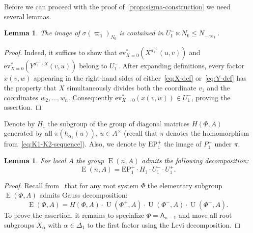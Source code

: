 \documentclass[oneside, 10pt]{amsart}
\DeclareMathOperator{\E}{E}
\DeclareMathOperator{\UU}{U}
\newcommand{\rA}{\mathsf{A}}
\numberwithin{equation}{section}
\numberwithin{thm}{section}
\newtheorem{lemma}[thm]{Lemma}
\numberwithin{lemma}{section}
\theoremstyle{definition}
\theoremstyle{remark}
\begin{document}
Before we can proceed with the proof of~\cref{prop:sigma-construction} we need several lemmas.
\begin{lemma}\label{lem:sigma-N0-image}
The image of $\sigma(\varpi_1)_{N_0}$ is contained in $U_1^- \ltimes N_0 \leq N_{-\varpi_1}$.
\end{lemma}
\begin{proof}
Indeed, it suffices to show that $\mathrm{ev}_{X=0}^*(X^{d_1^{-1}}(u, v))$ and $\mathrm{ev}_{X=0}^*(Y^{d^{-1}_1 \cdot X}(v, u))$ belong to $U_1^-$.
After expanding definitions, every factor $x(v, w)$ appearing in the right-hand sides of either~\eqref{eq:X-def} or~\eqref{eq:Y-def}
has the property that $X$ simultaneously divides both the coordinate $v_1$ and the coordinates $w_2, \ldots, w_n$.
Consequently $\mathrm{ev}_{X=0}^* \left(x(v, w)\right) \in U_1^-$, proving the assertion.
\end{proof}

Denote by $H_{1}$ the subgroup of the group of diagonal matrices $H(\Phi, A)$ generated by all $\pi(h_{\alpha_1}(u))$, $u \in A^\times$
(recall that $\pi$ denotes the homomorphism from~\eqref{eq:K1-K2-sequence}).
Also, we denote by $\mathrm{EP}_1^+$ the image of $P_1^+$ under $\pi$.
\begin{lemma} \label{lem:cor-Gauss}
For local $A$ the group $\E(n, A)$ admits the following decomposition:
\[\E(n, A) = \mathrm{EP}_1^+ \cdot H_{1} \cdot U^-_1 \cdot U^+_1. \]
\end{lemma}
\begin{proof}
Recall from~\cite[Theorem~1.1]{Sm12} that for any root system $\Phi$ the elementary subgroup $\E(\Phi, A)$ admits Gauss decomposition:
\[ \E(\Phi, A) = H(\Phi, A) \cdot \UU(\Phi^+, A) \cdot \UU(\Phi^-, A) \cdot \UU(\Phi^+, A). \]
To prove the assertion, it remains to specialize $\Phi = \rA_{n-1}$ and move all root subgroups
$X_\alpha$ with $\alpha \in \Delta_1$ to the first factor using the Levi decomposition.
\end{proof}
\end{document}
